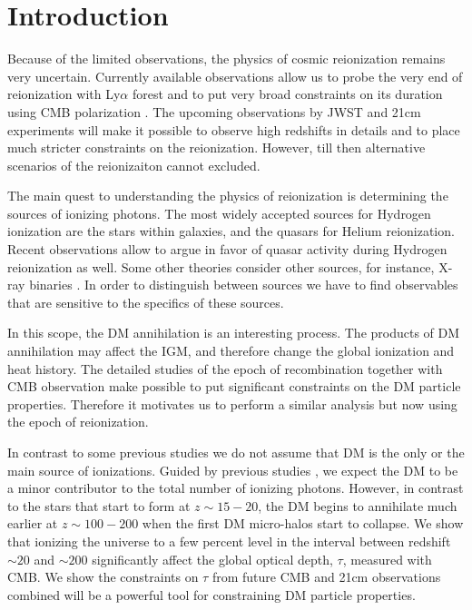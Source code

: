 \section{Introduction}

Because of the limited observations, the physics of cosmic reionization remains very uncertain. Currently available observations allow us to probe the very end of reionization with Ly$\alpha$ forest \citep{Becker_2015} and to put very broad constraints on its duration using CMB polarization \citep{Zahn_2012}. The upcoming observations by JWST and 21cm experiments will make it possible to observe high redshifts in details and to place much stricter constraints on the reionization. However, till then alternative scenarios of the reionizaiton cannot excluded.

The main quest to understanding the physics of reionization is determining the sources of ionizing photons. The most widely accepted sources for Hydrogen ionization are the stars within galaxies, and the quasars for Helium reionization. Recent observations allow \cite{2015arXiv150707678M} to argue in favor of quasar activity during Hydrogen reionization as well. Some other theories consider other sources, for instance, X-ray binaries \cite{Fialkov_2014}. In order to distinguish between sources we have to find observables that are sensitive to the specifics of these sources.

In this scope, the DM annihilation is an interesting process. The products of DM annihilation may affect the IGM, and therefore change the global ionization and heat history. The detailed studies of the epoch of recombination \citet{2015arXiv150603811S} together with CMB observation \cite{2015arXiv150201589P} make possible to put significant constraints on the DM particle properties. Therefore it motivates us to perform a similar analysis but now using the epoch of reionization. 

In contrast to some previous studies \cite{2009JCAP...10..009C, 2009PhRvD..80c5007B} we do not assume that DM is the only or the main source of ionizations. Guided by previous studies \cite{H_tsi_2009}, we expect the DM to be a minor contributor to the total number of ionizing photons. However, in contrast to the stars that start to form at $z\sim 15-20$, the DM begins to annihilate much earlier at $z\sim100-200$ when the first DM micro-halos start to collapse. We show that ionizing the universe to a few percent level in the interval between redshift $\sim20$ and $\sim200$ significantly affect the global optical depth, $\tau$, measured with CMB. We show the constraints on $\tau$ from future CMB and 21cm observations combined will be a powerful tool for constraining DM particle properties.

